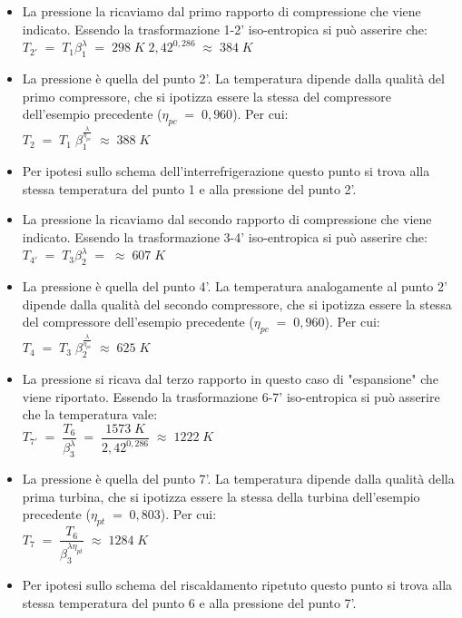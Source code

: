 \documentclass[a4paper, twoside, 12pt]{report}
\begin{document}
\begin{itemize}
	\item[\textbf{Stato 2'}] La pressione la ricaviamo dal primo rapporto di compressione che viene indicato. Essendo la trasformazione 1-2' iso-entropica si può asserire che:\\
	$T_{2'}\;=\;T_{1}\beta_{1}^{\lambda}\;=\;298\;K\;2,42^{0,286}\;\approx\;384\;K$
	\item[\textbf{Stato 2  }] La pressione è quella del punto 2'. La temperatura dipende dalla qualità del primo compressore, che si ipotizza essere la stessa del compressore dell'esempio precedente ($\eta_{pc}\;=\;0,960$). Per cui:\\
	$T_{2}\;=\;T_{1}\;\beta_{1}^{\frac{\lambda}{\eta_{pc}}}\;\approx\;388\;K$
	\item[\textbf{Stato 3  }] Per ipotesi sullo schema dell'interrefrigerazione questo punto si trova alla stessa temperatura del punto 1 e alla pressione del punto 2'.
	\item[\textbf{Stato 4'}] La pressione la ricaviamo dal secondo rapporto di compressione che viene indicato. Essendo la trasformazione 3-4' iso-entropica si può asserire che:\\
	$T_{4'}\;=\;T_{3}\beta_{2}^{\lambda}\;=\;\approx\;607\;K$
	\item[\textbf{Stato 4  }] La pressione è quella del punto 4'. La temperatura analogamente al punto 2' dipende dalla qualità del secondo compressore, che si ipotizza essere la stessa del compressore dell'esempio precedente ($\eta_{pc}\;=\;0,960$). Per cui:\\
	$T_{4}\;=\;T_{3}\;\beta_{2}^{\frac{\lambda}{\eta_{pc}}}\;\approx\;625\;K$
	\item[\textbf{Stato 7'}] La pressione si ricava dal terzo rapporto in questo caso di "espansione" che viene riportato. Essendo la trasformazione 6-7' iso-entropica si può asserire che la temperatura vale:\\
	$T_{7'}\;=\;\dfrac{T_{6}}{\beta_{3}^{\lambda}}\;=\;\dfrac{1573\;K}{2,42^{0,286}}\;\approx\;1222\;K$
	\item[\textbf{Stato 7  }] La pressione è quella del punto 7'. La temperatura dipende dalla qualità della prima turbina, che si ipotizza essere la stessa della turbina dell'esempio precedente ($\eta_{pt}\;=\;0,803$). Per cui:\\
	$T_{7}\;=\;\dfrac{T_{6}}{\beta_{3}^{\lambda\eta_{pt}}}\;\approx\;1284\;K$
	\item[\textbf{Stato 8  }] Per ipotesi sullo schema del riscaldamento ripetuto questo punto si trova alla stessa temperatura del punto 6 e alla pressione del punto 7'.

\end{itemize}
\end{document}
